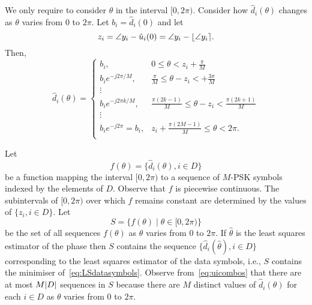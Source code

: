 \documentclass[journal]{IEEEtran}
\begin{document}
We only require to consider $\theta$ in the interval $[0, 2\pi)$.  Consider how $\hat{d}_i(\theta)$ changes as $\theta$ varies from $0$ to $2\pi$.  Let $b_i = \hat{d}_i(0)$ and let 
\[
z_i = \angle{y_i} - \hat{u}_i(0) = \angle{y_i} - {\left\lfloor \angle{y_i} \right\rceil}.
\]
Then,
\begin{equation}\label{eq:uicombos}
\hat{d}_i(\theta) = 
\begin{cases}
b_i, &  0 \leq \theta < z_i + \frac{\pi}{M} \\
b_i e^{-j2\pi/M}, & \frac{\pi}{M} \leq \theta - z_i < + \frac{3\pi}{M} \\ 
\vdots & \\
b_i e^{-j2\pi k /M}, & \frac{\pi(2k - 1)}{M} \leq \theta - z_i < \frac{\pi(2k + 1)}{M}  \\ 
\vdots & \\
b_i e^{-j2\pi} = b_i, &  z_i + \frac{\pi(2M - 1)}{M} \leq \theta < 2\pi. \\
\end{cases}
\end{equation}

Let 
\[
f(\theta) = \{ \hat{d}_i(\theta), i \in D \}
\]
be a function mapping the interval $[0, 2\pi)$ to a sequence of $M$-PSK symbols indexed by the elements of $D$.  Observe that $f$ is piecewise continuous.  The subintervals of $[0, 2\pi)$ over which $f$ remains constant are determined by the values of $\{z_i, i \in D\}$.  Let
\[
S = \{ f(\theta) \mid \theta \in [0, 2 \pi) \}
\]
be the set of all sequences $f(\theta)$ as $\theta$ varies from $0$ to $2\pi$.  If $\hat{\theta}$ is the least squares estimator of the phase then $S$ contains the sequence $\{ \hat{d}_i(\hat{\theta}), i \in D \}$ corresponding to the least squares estimator of the data symbols, i.e., $S$ contains the minimiser of~\eqref{eq:LSdatasymbols}.  Observe from~\eqref{eq:uicombos} that there are at most $M{\left\vert D \right\vert}$ sequences in $S$ because there are $M$ distinct values of $\hat{d}_i(\theta)$ for each $i \in D$ as $\theta$ varies from $0$ to $2\pi$.
\end{document}
